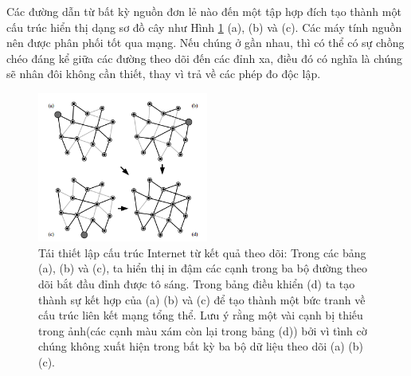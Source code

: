 Các đường dẫn từ bất kỳ nguồn đơn lẻ nào đến một tập hợp đích tạo thành một cấu trúc hiển thị dạng sơ đồ cây như Hình \ref{fig:h22} (a), (b) và (c). Các máy tính nguồn nên được phân phối tốt qua mạng. Nếu chúng ở gần nhau, thì có thể có sự chồng chéo đáng kể giữa các đường theo dõi đến các đỉnh xa, điều đó có nghĩa là chúng sẽ nhân đôi không cần thiết, thay vì trả về các phép đo độc lập.\par

\begin{figure}[ht]
\centering
\includegraphics[width=0.5\textwidth]{res/h22.png}
\caption{Tái thiết lập cấu trúc Internet từ kết quả theo dõi: Trong các bảng (a), (b) và (c), ta hiển thị in đậm các cạnh trong ba bộ đường theo dõi bắt đầu đỉnh được tô sáng. Trong bảng điều khiển (d) ta tạo thành sự kết hợp của (a) (b) và (c) để tạo thành một bức tranh về cấu trúc liên kết mạng tổng thể. Lưu ý rằng một vài cạnh bị thiếu trong ảnh(các cạnh màu xám còn lại trong bảng (d)) bởi vì tình cờ chúng không xuất hiện trong bất kỳ ba bộ dữ liệu theo dõi (a) (b) (c).}
\label{fig:h22}
\end{figure}

